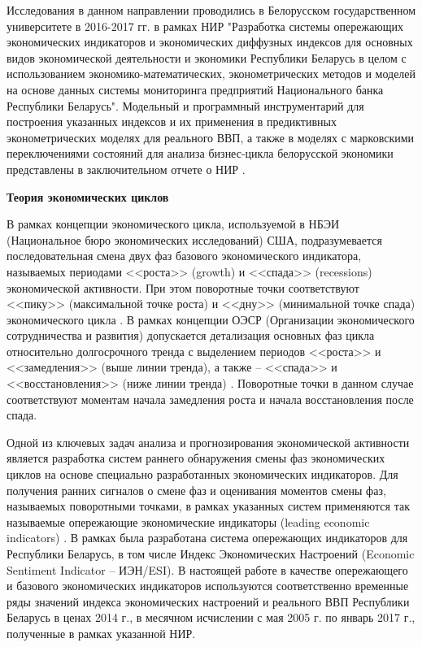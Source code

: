 \documentclass[a4paper,14pt]{extreport}
\begin{document}
	Исследования в данном направлении проводились в Белорусском государственном университете в 2016-2017 гг. в рамках НИР "Разработка системы опережающих экономических индикаторов и экономических диффузных индексов для основных видов экономической деятельности и экономики Республики Беларусь в целом с использованием экономико-математических, эконометрических методов и моделей на основе данных системы мониторинга предприятий Национального банка Республики Беларусь". Модельный и программный инструментарий для построения указанных  индексов и их применения в предиктивных эконометрических моделях для реального ВВП, а также в моделях с марковскими переключениями состояний для анализа бизнес-цикла белорусской экономики представлены в заключительном отчете о НИР \cite{esiMaking}.
	
	\bigskip
	\textbf{Теория экономических циклов}
	
	В рамках концепции экономического цикла, используемой в НБЭИ (Национальное бюро экономических исследований) США, подразумевается последовательная смена двух фаз базового экономического индикатора, называемых периодами <<роста>> (growth)  и <<спада>> (recessions) экономической активности. При этом поворотные точки соответствуют <<пику>> (максимальной точке роста) и <<дну>> (минимальной точке спада) экономического цикла \cite{nberDevelopment}.  В рамках концепции ОЭСР (Организации экономического сотрудничества и развития) допускается  детализация основных фаз цикла относительно долгосрочного тренда с выделением периодов <<роста>> и <<замедления>> (выше линии тренда), а также  -- <<спада>> и <<восстановления>>  (ниже линии тренда) \cite{oecdCycleExtraction}. Поворотные точки в данном случае соответствуют моментам начала замедления роста и начала восстановления после спада. 
	
	Одной из ключевых задач анализа и прогнозирования экономической активности является разработка систем раннего обнаружения смены фаз экономических циклов на основе специально разработанных экономических индикаторов. Для получения ранних сигналов о смене фаз и оценивания моментов смены фаз, называемых поворотными точками, в рамках указанных систем применяются так называемые опережающие экономические индикаторы (leading economic indicators) \cite{oecdCLI}. В рамках \cite{esiMaking,esiMakingAlt,esiExtra} была разработана система опережающих индикаторов для Республики Беларусь, в том числе Индекс Экономических Настроений (Economic Sentiment Indicator -- ИЭН/ESI). В настоящей работе в качестве опережающего и базового экономических индикаторов используются соответственно временные ряды значений индекса экономических настроений и реального ВВП Республики Беларусь в ценах 2014 г., в месячном исчислении с мая 2005 г. по январь 2017 г., полученные в рамках указанной НИР.
	
\end{document}

